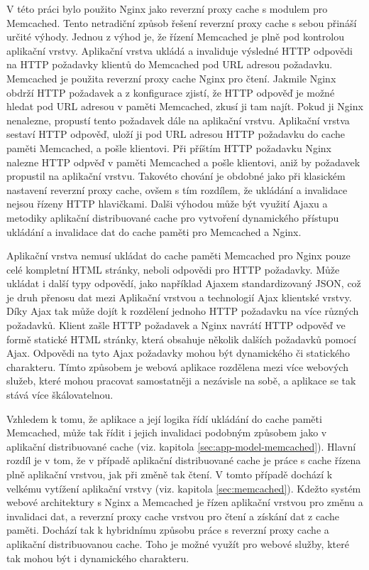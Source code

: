 \documentclass[12pt]{article}
\begin{document}
V této práci bylo použito Nginx jako reverzní proxy cache s modulem pro Memcached. Tento netradiční způsob řešení reverzní proxy cache s sebou přináší určité výhody. Jednou z výhod je, že řízení Memcached je plně pod kontrolou aplikační vrstvy. Aplikační vrstva ukládá a invaliduje výsledné HTTP odpovědi na HTTP požadavky klientů do Memcached pod URL adresou požadavku. Memcached je použita reverzní proxy cache Nginx pro čtení. Jakmile Nginx obdrží HTTP požadavek a z konfigurace zjistí, že HTTP odpověď je možné hledat pod URL adresou v paměti Memcached, zkusí ji tam najít. Pokud ji Nginx nenalezne, propustí tento požadavek dále na aplikační vrstvu. Aplikační vrstva sestaví HTTP odpověď, uloží ji pod URL adresou HTTP požadavku do cache paměti Memcached, a pošle klientovi. Při příštím HTTP požadavku Nginx nalezne HTTP odpvěď v paměti Memcached a pošle klientovi, aniž by požadavek propustil na aplikační vrstvu. Takovéto chování je obdobné jako při klasickém nastavení reverzní proxy cache, ovšem s tím rozdílem, že ukládání a invalidace nejsou řízeny HTTP hlavičkami. Dalši výhodou může být využití Ajaxu a metodiky aplikační distribuované cache pro vytvoření dynamického přístupu ukládání a invalidace dat do cache paměti pro Memcached a Nginx.\cite{nginx-memcached}

\obrazek
{}

\label{sec:ajax-nginx-memcached}
Aplikační vrstva nemusí ukládat do cache paměti Memcached pro Nginx pouze celé kompletní HTML stránky, neboli odpovědi pro HTTP požadavky. Může ukládat i další typy odpovědí, jako například Ajaxem standardizovaný JSON, což je druh přenosu dat mezi Aplikační vrstvou a technologií Ajax klientské vrstvy. Díky Ajax tak může dojít k rozdělení jednoho HTTP požadavku na více různých požadavků. Klient zašle HTTP požadavek a Nginx navrátí HTTP odpověď ve formě statické HTML stránky, která obsahuje několik dalších požadavků pomocí Ajax. Odpovědi na tyto Ajax požadavky mohou být dynamického či statického charakteru. Tímto způsobem je webová aplikace rozdělena mezi více webových služeb, které mohou pracovat samostatněji a nezávisle na sobě, a aplikace se tak stává více škálovatelnou.

Vzhledem k tomu, že aplikace a její logika řídí ukládání do cache paměti Memcached, může tak řídit i jejich invalidaci podobným způsobem jako v aplikační distribuované cache (viz. kapitola \ref{sec:app-model-memcached}). Hlavní rozdíl je v tom, že v případě aplikační distribuované cache je práce s cache řízena plně aplikační vrstvou, jak při změně tak čtení. V tomto případě dochází k velkému vytížení aplikační vrstvy (viz. kapitola \ref{sec:memcached}). Kdežto systém webové architektury s Nginx a Memcached je řízen aplikační vrstvou pro změnu a invalidaci dat, a reverzní proxy cache vrstvou pro čtení a získání dat z cache paměti. Dochází tak k hybridnímu způsobu práce s reverzní proxy cache a aplikační distribuovanou cache. Toho je možné využít pro webové služby, které tak mohou být i dynamického charakteru.
\end{document}

